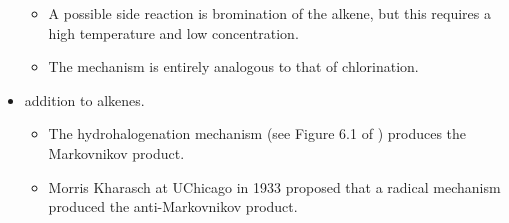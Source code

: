 \documentclass[../notes.tex]{subfiles}
\begin{document}
\begin{itemize}
    \begin{itemize}
        \item A possible side reaction is bromination of the alkene, but this requires a high temperature and low concentration.
        \item The mechanism is entirely analogous to that of chlorination.
    \end{itemize}
    \item {} addition to alkenes.
    \begin{itemize}
        \item The hydrohalogenation mechanism (see Figure 6.1 of \textcite{bib:CHEM22000Notes}) produces the Markovnikov product.
        \item Morris Kharasch at UChicago in 1933 proposed that a radical mechanism produced the anti-Markovnikov product.

\end{itemize}
\end{itemize}
\end{document}

